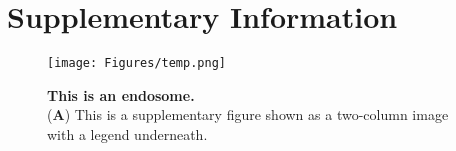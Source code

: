 
\onecolumn %
\fancyhead{} %
\renewcommand{\floatpagefraction}{0.1}
\lfoot[\bSupInf]{\dAuthor}
\rfoot[\dAuthor]{\cSupInf}
\newpage

\captionsetup*{format=largeformat} %
\setcounter{figure}{0} %
\setcounter{equation}{0} %
\makeatletter
\renewcommand{\thefigure}{S\@arabic\c@figure} %
\makeatother
\def\theequation{S\arabic{equation}}


\newpage
\section*{Supplementary Information}

\begin{figure*}[!ht]
	\centering
	\texttt{[image: Figures/temp.png]}
	\caption{\textbf{This is an endosome.}\\
		(\textbf{A}) This is a supplementary figure shown as a two-column image with a legend underneath.}
	\label{suppfig:endosome}
\end{figure*}



















